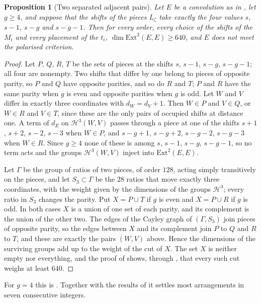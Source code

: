\documentclass[11pt,reqno]{amsart}
\numberwithin{equation}{section}
\theoremstyle{plain}
\newtheorem{proposition}[theorem]{Proposition}
\theoremstyle{definition}
\newcommand{\Ext}{\mathrm{Ext}}
\newcommand{\cH}{\mathcal{H}}
\begin{document}
\begin{proposition}[Two separated adjacent pairs]\label{prop:efourpairsg}
Let $E$ be a convolution as in \cite[Lemma~18.36]{BMB26}, let $g\ge4$, and suppose that the shifts of the pieces $L_{\zeta}$ take exactly the four values $s$, $s-1$, $s-g$ and $s-g-1$. Then for every order, every choice of the shifts of the $M_{i}$ and every placement of the $t_{i}$, $\dim\Ext^{2}(E,E)\ge640$, and $E$ does not meet the polarised criterion.
\end{proposition}

\begin{proof}
Let $P$, $Q$, $R$, $T$ be the sets of pieces at the shifts $s$, $s-1$, $s-g$, $s-g-1$; all four are nonempty. Two shifts that differ by one belong to pieces of opposite parity, so $P$ and $Q$ have opposite parities, and so do $R$ and $T$; $P$ and $R$ have the same parity when $g$ is even and opposite parities when $g$ is odd. Let $W$ and $V$ differ in exactly three coordinates with $d_{W}=d_{V}+1$. Then $W\in P$ and $V\in Q$, or $W\in R$ and $V\in T$, since these are the only pairs of occupied shifts at distance one. A term of $d_{E}$ on $\cH^{3}(W,V)$ passes through a piece at one of the shifts $s+1$, $s+2$, $s-2$, $s-3$ when $W\in P$, and $s-g+1$, $s-g+2$, $s-g-2$, $s-g-3$ when $W\in R$. Since $g\ge4$ none of these is among $s$, $s-1$, $s-g$, $s-g-1$, so no term acts and the groups $\cH^{3}(W,V)$ inject into $\Ext^{2}(E,E)$.

Let $\Gamma$ be the group of ratios of two pieces, of order $128$, acting simply transitively on the pieces, and let $S_{3}\subset\Gamma$ be the $28$ ratios that move exactly three coordinates, with the weight given by the dimensions of the groups $\cH^{3}$; every ratio in $S_{3}$ changes the parity. Put $X=P\cup T$ if $g$ is even and $X=P\cup R$ if $g$ is odd. In both cases $X$ is a union of one set of each parity, and its complement is the union of the other two. The edges of the Cayley graph of $(\Gamma,S_{3})$ join pieces of opposite parity, so the edges between $X$ and its complement join $P$ to $Q$ and $R$ to $T$, and these are exactly the pairs $(W,V)$ above. Hence the dimensions of the surviving groups add up to the weight of the cut of $X$. The set $X$ is neither empty nor everything, and the proof of \cite[Prop.~18.47]{BMB26} shows, through \cite[Lemma~18.40]{BMB26}, that every such cut weighs at least $640$.
\end{proof}

For $g=4$ this is \cite[Prop.~18.47]{BMB26}. Together with the results of \cite[\S18]{BMB26} it settles most arrangements in seven consecutive integers.
\end{document}
